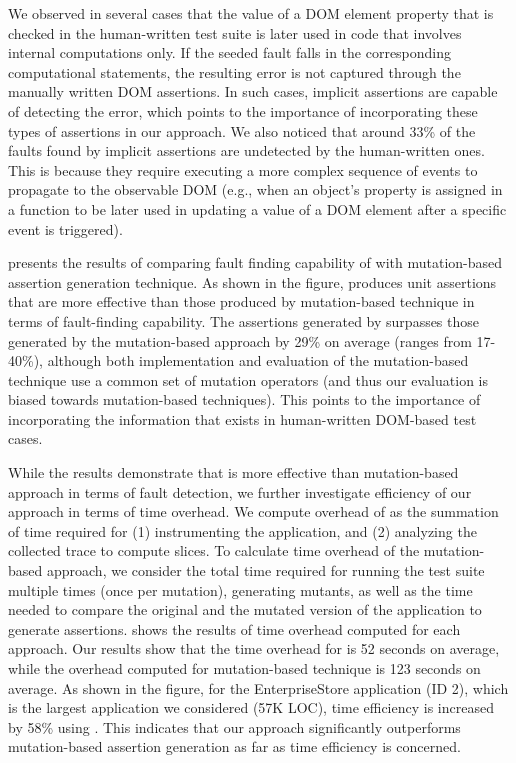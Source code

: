 We observed in several cases that the value of a DOM element property that is checked in the human-written test suite is later used in \javascript code that involves internal computations only. If the seeded fault falls in the corresponding computational statements, the resulting error is not captured through the manually written DOM assertions. In such cases, implicit assertions are capable of detecting the error, which points to the importance of incorporating these types of assertions in our approach. We also noticed that around 33\% of the faults found by implicit assertions are undetected by the human-written ones. This is because they require executing a more complex sequence of events to propagate to the observable DOM (e.g., when an object's property is assigned in a function to be later used in updating a value of a DOM element after a specific event is triggered). 

 presents the results of comparing fault finding capability of \tool with mutation-based assertion generation technique. As shown in the figure, \tool produces unit assertions that are more effective than those produced by mutation-based technique in terms of fault-finding capability. The assertions generated by \tool surpasses those generated by the mutation-based approach by 29\% on average (ranges from 17-40\%), although both implementation and evaluation of the mutation-based technique use a common set of mutation operators (and thus our evaluation is biased towards mutation-based techniques).
This points to the importance of incorporating the information that exists in human-written DOM-based test cases.       

While the results demonstrate that \tool is more effective than mutation-based approach in terms of fault detection, we further investigate efficiency of our approach in terms of time overhead. 
We compute overhead of \tool as the summation of time required for (1) instrumenting the application, and (2) analyzing the collected trace to compute \javascript slices. To calculate time overhead of the mutation-based approach, we consider the total time required for running the test suite multiple times (once per mutation), generating mutants, as well as the time needed to compare the original and the mutated version of the application to generate assertions.  shows the results of time overhead computed for each approach.    
Our results show that the time overhead for \tool is 52 seconds on average, while the overhead computed for mutation-based technique is 123 seconds on average. As shown in the figure, for the EnterpriseStore application (ID 2), which is the largest application we considered (57K LOC), time efficiency is increased by 58\% using \tool. This indicates that our approach significantly outperforms mutation-based assertion generation as far as time efficiency is concerned. 
